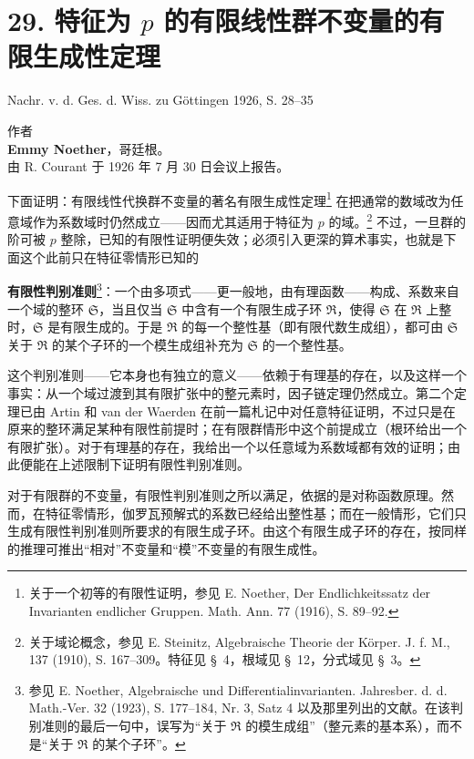 \documentclass[11pt]{article}
\newcommand{\srcemph}[1]{\textbf{#1}}
\begin{document}
\section*{29. 特征为 $p$ 的有限线性群不变量的有限生成性定理}

\begin{center}
Nachr. v. d. Ges. d. Wiss. zu Göttingen 1926, S. 28--35
\end{center}

\setcounter{footnote}{0}

\begin{center}
作者\\[0.5em]
\textbf{Emmy Noether}，哥廷根。\\[1em]
由 R. Courant 于 1926 年 7 月 30 日会议上报告。
\end{center}

下面证明：有限线性代换群不变量的著名有限生成性定理\footnote{关于一个初等的有限性证明，参见 E. Noether, Der Endlichkeitssatz der Invarianten endlicher Gruppen. Math. Ann. 77 (1916), S. 89--92.} 在把通常的数域改为任意域作为系数域时仍然成立——因而尤其适用于特征为 $p$ 的域。\footnote{关于域论概念，参见 E. Steinitz, Algebraische Theorie der Körper. J. f. M., 137 (1910), S. 167--309。特征见 \S\ 4，根域见 \S\ 12，分式域见 \S\ 3。} 不过，一旦群的阶可被 $p$ 整除，已知的有限性证明便失效；必须引入更深的算术事实，也就是下面这个此前只在特征零情形已知的

\srcemph{有限性判别准则}\footnote{参见 E. Noether, Algebraische und Differentialinvarianten. Jahresber. d. d. Math.-Ver. 32 (1923), S. 177--184, Nr. 3, Satz 4 以及那里列出的文献。在该判别准则的最后一句中，误写为“关于 $\mathfrak R$ 的模生成组”（整元素的基本系），而不是“关于 $\mathfrak R$ 的某个子环”。}：一个由多项式——更一般地，由有理函数——构成、系数来自一个域的整环 $\mathfrak S$，当且仅当 $\mathfrak S$ 中含有一个有限生成子环 $\mathfrak R$，使得 $\mathfrak S$ 在 $\mathfrak R$ 上整时，$\mathfrak S$ 是有限生成的。于是 $\mathfrak R$ 的每一个整性基（即有限代数生成组），都可由 $\mathfrak S$ 关于 $\mathfrak R$ 的某个子环的一个模生成组补充为 $\mathfrak S$ 的一个整性基。

这个判别准则——它本身也有独立的意义——依赖于有理基的存在，以及这样一个事实：从一个域过渡到其有限扩张中的整元素时，因子链定理仍然成立。第二个定理已由 Artin 和 van der Waerden 在前一篇札记中对任意特征证明，不过只是在原来的整环满足某种有限性前提时；在有限群情形中这个前提成立（根环给出一个有限扩张）。对于有理基的存在，我给出一个以任意域为系数域都有效的证明；由此便能在上述限制下证明有限性判别准则。

对于有限群的不变量，有限性判别准则之所以满足，依据的是对称函数原理。然而，在特征零情形，伽罗瓦预解式的系数已经给出整性基；而在一般情形，它们只生成有限性判别准则所要求的有限生成子环。由这个有限生成子环的存在，按同样的推理可推出“相对”不变量和“模”不变量的有限生成性。
\end{document}
